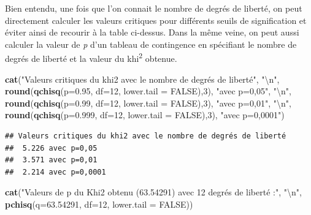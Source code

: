 \documentclass[
  11pt,
  french,
]{book}
\makeatletter
\newenvironment{Shaded}{\begin{snugshade}}{\end{snugshade}}
\newcommand{\CharTok}[1]{\textcolor[rgb]{0.31,0.60,0.02}{#1}}
\newcommand{\DataTypeTok}[1]{\textcolor[rgb]{0.13,0.29,0.53}{#1}}
\newcommand{\DecValTok}[1]{\textcolor[rgb]{0.00,0.00,0.81}{#1}}
\newcommand{\FloatTok}[1]{\textcolor[rgb]{0.00,0.00,0.81}{#1}}
\newcommand{\KeywordTok}[1]{\textcolor[rgb]{0.13,0.29,0.53}{\textbf{#1}}}
\newcommand{\NormalTok}[1]{#1}
\newcommand{\OtherTok}[1]{\textcolor[rgb]{0.56,0.35,0.01}{#1}}
\newcommand{\StringTok}[1]{\textcolor[rgb]{0.31,0.60,0.02}{#1}}
\newenvironment{kframe}{%
\medskip{}
\setlength{\fboxsep}{.8em}
 \def\at@end@of@kframe{}%
 \ifinner\ifhmode%
  \def\at@end@of@kframe{\end{minipage}}%
  \begin{minipage}{\columnwidth}%
 \fi\fi%
 \def\FrameCommand##1{\hskip\@totalleftmargin \hskip-\fboxsep
 \colorbox{shadecolor}{##1}\hskip-\fboxsep
     \hskip-\linewidth \hskip-\@totalleftmargin \hskip\columnwidth}%
 \MakeFramed {\advance\hsize-\width
   \@totalleftmargin\z@ \linewidth\hsize
   \@setminipage}}%
 {\par\unskip\endMakeFramed%
 \at@end@of@kframe}
\renewenvironment{Shaded}{\begin{kframe}}{\end{kframe}}
\makeatother
\begin{document}
Bien entendu, une fois que l'on connait le nombre de degrés de liberté, on peut directement calculer les valeurs critiques pour différents seuils de signification et éviter ainsi de recourir à la table ci-dessus. Dans la même veine, on peut aussi calculer la valeur de \emph{p} d'un tableau de contingence en spécifiant le nombre de degrés de liberté et la valeur du khi\textsuperscript{2} obtenue.

\begin{Shaded}
\begin{Highlighting}[]
\KeywordTok{cat}\NormalTok{(}\StringTok{"Valeurs critiques du khi2 avec le nombre de degrés de liberté"}\NormalTok{, }\StringTok{"}\CharTok{\textbackslash{}n}\StringTok{"}\NormalTok{,}
    \KeywordTok{round}\NormalTok{(}\KeywordTok{qchisq}\NormalTok{(}\DataTypeTok{p=}\FloatTok{0.95}\NormalTok{,  }\DataTypeTok{df=}\DecValTok{12}\NormalTok{, }\DataTypeTok{lower.tail =} \OtherTok{FALSE}\NormalTok{),}\DecValTok{3}\NormalTok{), }\StringTok{"avec p=0,05"}\NormalTok{, }\StringTok{"}\CharTok{\textbackslash{}n}\StringTok{"}\NormalTok{,}
    \KeywordTok{round}\NormalTok{(}\KeywordTok{qchisq}\NormalTok{(}\DataTypeTok{p=}\FloatTok{0.99}\NormalTok{,  }\DataTypeTok{df=}\DecValTok{12}\NormalTok{, }\DataTypeTok{lower.tail =} \OtherTok{FALSE}\NormalTok{),}\DecValTok{3}\NormalTok{), }\StringTok{"avec p=0,01"}\NormalTok{, }\StringTok{"}\CharTok{\textbackslash{}n}\StringTok{"}\NormalTok{,}
    \KeywordTok{round}\NormalTok{(}\KeywordTok{qchisq}\NormalTok{(}\DataTypeTok{p=}\FloatTok{0.999}\NormalTok{, }\DataTypeTok{df=}\DecValTok{12}\NormalTok{, }\DataTypeTok{lower.tail =} \OtherTok{FALSE}\NormalTok{),}\DecValTok{3}\NormalTok{), }\StringTok{"avec p=0,0001"}\NormalTok{)}
\end{Highlighting}
\end{Shaded}

\begin{verbatim}
## Valeurs critiques du khi2 avec le nombre de degrés de liberté 
##  5.226 avec p=0,05 
##  3.571 avec p=0,01 
##  2.214 avec p=0,0001
\end{verbatim}

\begin{Shaded}
\begin{Highlighting}[]
\KeywordTok{cat}\NormalTok{(}\StringTok{"Valeurs de p du Khi2 obtenu (63.54291) avec 12 degrés de liberté :"}\NormalTok{, }\StringTok{"}\CharTok{\textbackslash{}n}\StringTok{"}\NormalTok{,}
    \KeywordTok{pchisq}\NormalTok{(}\DataTypeTok{q=}\FloatTok{63.54291}\NormalTok{, }\DataTypeTok{df=}\DecValTok{12}\NormalTok{, }\DataTypeTok{lower.tail =} \OtherTok{FALSE}\NormalTok{))}
\end{Highlighting}
\end{Shaded}
\end{document}
